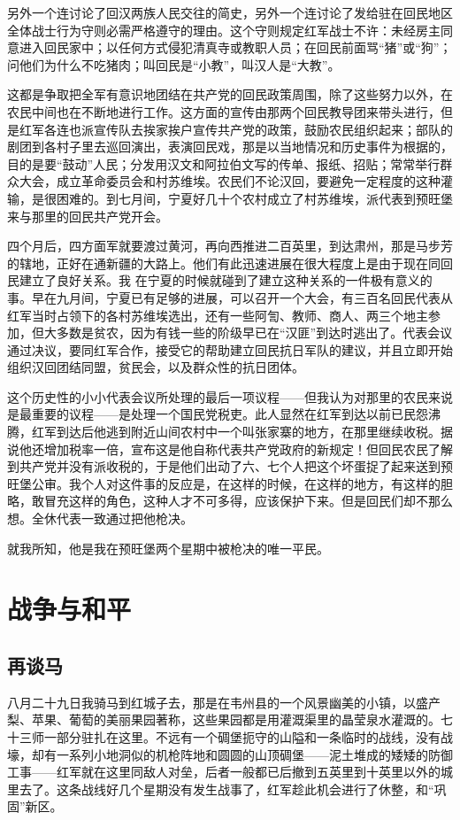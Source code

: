 \documentclass[10pt]{book}
\begin{document}
另外一个连讨论了回汉两族人民交往的简史，另外一个连讨论了发给驻在回民地区全体战士行为守则必需严格遵守的理由。这个守则规定红军战士不许：未经房主同意进入回民家中；以任何方式侵犯清真寺或教职人员；在回民前面骂“猪”或“狗”；问他们为什么不吃猪肉；叫回民是“小教”，叫汉人是“大教”。

这都是争取把全军有意识地团结在共产党的回民政策周围，除了这些努力以外，在农民中间也在不断地进行工作。这方面的宣传由那两个回民教导团来带头进行，但是红军各连也派宣传队去挨家挨户宣传共产党的政策，鼓励农民组织起来；部队的剧团到各村子里去巡回演出，表演回民戏，那是以当地情况和历史事件为根据的，目的是要“鼓动”人民；分发用汉文和阿拉伯文写的传单、报纸、招贴；常常举行群众大会，成立革命委员会和村苏维埃。农民们不论汉回，要避免一定程度的这种灌输，是很困难的。到七月间，宁夏好几十个农村成立了村苏维埃，派代表到预旺堡来与那里的回民共产党开会。

四个月后，四方面军就要渡过黄河，再向西推进二百英里，到达肃州，那是马步芳的辖地，正好在通新疆的大路上。他们有此迅速进展在很大程度上是由于现在同回民建立了良好关系。我 在宁夏的时候就碰到了建立这种关系的一件极有意义的事。早在九月间，宁夏已有足够的进展，可以召开一个大会，有三百名回民代表从红军当时占领下的各村苏维埃选出，还有一些阿訇、教师、商人、两三个地主参加，但大多数是贫农，因为有钱一些的阶级早已在“汉匪”到达时逃出了。代表会议通过决议，要同红军合作，接受它的帮助建立回民抗日军队的建议，并且立即开始组织汉回团结同盟，贫民会，以及群众性的抗日团体。

这个历史性的小小代表会议所处理的最后一项议程——但我认为对那里的农民来说是最重要的议程——是处理一个国民党税吏。此人显然在红军到达以前已民怨沸腾，红军到达后他逃到附近山间农村中一个叫张家寨的地方，在那里继续收税。据说他还增加税率一倍，宣布这是他自称代表共产党政府的新规定！但回民农民了解到共产党并没有派收税的，于是他们出动了六、七个人把这个坏蛋捉了起来送到预旺堡公审。我个人对这件事的反应是，在这样的时候，在这样的地方，有这样的胆略，敢冒充这样的角色，这种人才不可多得，应该保护下来。但是回民们却不那么想。全休代表一致通过把他枪决。

就我所知，他是我在预旺堡两个星期中被枪决的唯一平民。

\chapter{战争与和平}

\section{再谈马}

八月二十九日我骑马到红城子去，那是在韦州县的一个风景幽美的小镇，以盛产梨、苹果、葡萄的美丽果园著称，这些果园都是用灌溉渠里的晶莹泉水灌溉的。七十三师一部分驻扎在这里。不远有一个碉堡扼守的山隘和一条临时的战线，没有战壕，却有一系列小地洞似的机枪阵地和圆圆的山顶碉堡——泥土堆成的矮矮的防御工事——红军就在这里同敌人对垒，后者一般都已后撤到五英里到十英里以外的城里去了。这条战线好几个星期没有发生战事了，红军趁此机会进行了休整，和“巩固”新区。
\end{document}
